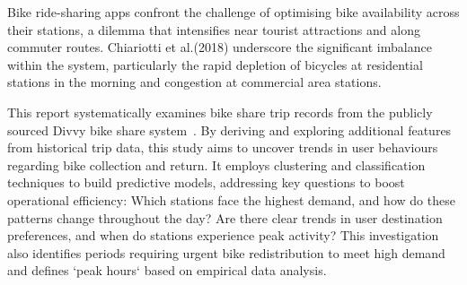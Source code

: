 Bike ride-sharing apps confront the challenge of optimising bike availability across their stations, a dilemma that intensifies near tourist attractions and along commuter routes.
Chiariotti et al.(2018)\cite{s18020512} underscore the significant imbalance within the system,
particularly the rapid depletion of bicycles at residential stations in the morning and congestion at commercial area stations.

This report systematically examines bike share trip records from the publicly sourced Divvy bike share system~\cite{DataSource}.
By deriving and exploring additional features from historical trip data, this study aims to uncover trends in user behaviours regarding bike collection and return.
It employs clustering and classification techniques to build predictive models, addressing key questions to boost operational efficiency: Which stations face the highest demand,
and how do these patterns change throughout the day?
Are there clear trends in user destination preferences, and when do stations experience peak activity?
This investigation also identifies periods requiring urgent bike redistribution to meet high demand and defines `peak hours` based on empirical data analysis.
